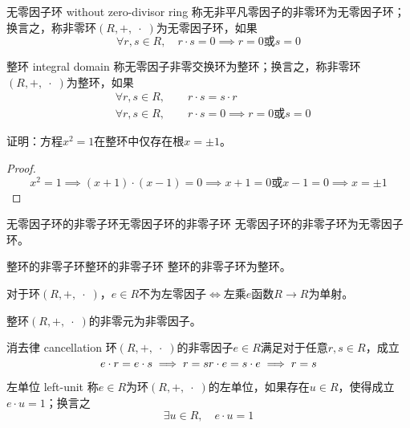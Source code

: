 \begin{definition}{无零因子环 without zero-divisor ring}
	称无非平凡零因子的非零环为无零因子环；换言之，称非零环$(R,+,\;\cdot\;)$为无零因子环，如果
	$$
	\forall r,s\in R,\quad r\cdot s=0\implies r=0\text{或}s=0
	$$
\end{definition}

\begin{definition}{整环 integral domain}
	称无零因子非零交换环为整环；换言之，称非零环$(R,+,\;\cdot\;)$为整环，如果
	\begin{align*}
		&\forall r,s\in R,\qquad r\cdot s=s\cdot r\\
		&\forall r,s\in R,\qquad r\cdot s=0\implies r=0\text{或}s=0
	\end{align*}
\end{definition}

\begin{example}
	证明：方程$x^2=1$在整环中仅存在根$x=\pm 1$。
\end{example}

\begin{proof}
	$$
	x^2=1\implies (x+1)\cdot(x-1)=0\implies x+1=0\text{或}x-1=0\implies x=\pm 1
	$$
\end{proof}

\begin{proposition}{无零因子环的非零子环}{无零因子环的非零子环}
	无零因子环的非零子环为无零因子环。
\end{proposition}

\begin{proposition}{整环的非零子环}{整环的非零子环}
	整环的非零子环为整环。
\end{proposition}

\begin{proposition}
	对于环$(R,+,\;\cdot\;)$，$e\in R$不为左零因子$\iff$左乘$e$函数$R\to R$为单射。
\end{proposition}

\begin{proposition}
	整环$(R,+,\;\cdot\;)$的非零元为非零因子。
\end{proposition}

\begin{proposition}{消去律 cancellation}
	环$(R,+,\;\cdot\;)$的非零因子$e\in R$满足对于任意$r,s\in R$，成立
	$$
	e\cdot r=e\cdot s\implies r=s\\
	r\cdot e=s\cdot e\implies r=s
	$$
\end{proposition}

\begin{definition}{左单位 left-unit}
	称$e\in R$为环$(R,+,\;\cdot\;)$的左单位，如果存在$u\in R$，使得成立$e\cdot u=1$；换言之
	$$
	\exists u\in R,\quad e\cdot u=1
	$$
\end{definition}

